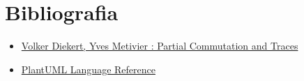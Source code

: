 \documentclass[11pt]{article}
\begin{document}
\section*{Bibliografia}
\label{sec:org7b0c724}
\begin{itemize}
\item \href{https://www.researchgate.net/publication/280851316\_Partial\_Commutation\_and\_Traces}{Volker Diekert, Yves Metivier : Partial Commutation and Traces}
\item \href{https://plantuml.com/guide}{PlantUML Language Reference}
\end{itemize}
\end{document}
